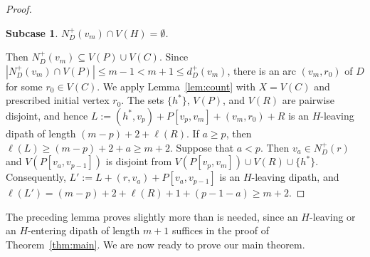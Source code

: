 \documentclass[12pt]{article}
\numberwithin{equation}{section}
\theoremstyle{plain}
\newtheorem{subcase}{Subcase}[case]
\theoremstyle{definition}
\begin{document}
\begin{proof}
\begin{subcase}
$N_D^+(v_m)\cap V(H)=\emptyset$.
\end{subcase}
Then $N_D^+(v_m)\subseteq V(P)\cup V(C)$.
Since $|N_D^+(v_m)\cap V(P)|\le m-1<m+1\le d_D^+(v_m)$, there is an arc $(v_m,r_0)$ of $D$ for some $r_0\in V(C)$.
We apply Lemma~\ref{lem:count} with $X=V(C)$ and prescribed initial vertex $r_0$.
The sets $\{h^*\}$, $V(P)$, and $V(R)$ are pairwise disjoint, and hence $L:=(h^*,v_p)+P[v_p,v_m]+(v_m,r_0)+R$ is an $H$-leaving dipath of length $(m-p)+2+\ell(R)$.
If $a\ge p$, then $\ell(L)\ge(m-p)+2+a\ge m+2$.
Suppose that $a<p$.
Then $v_a\in N_D^+(r)$ and $V(P[v_a,v_{p-1}])$ is disjoint from $V(P[v_p,v_m])\cup V(R)\cup\{h^*\}$.
Consequently, $L':=L+(r,v_a)+P[v_a,v_{p-1}]$ is an $H$-leaving dipath, and $\ell(L')=(m-p)+2+\ell(R)+1+(p-1-a)\ge m+2$.
\end{proof}

The preceding lemma proves slightly more than is needed, since an $H$-leaving or an $H$-entering dipath of length $m+1$ suffices in the proof of Theorem~\ref{thm:main}. We are now ready to prove our main theorem.
\end{document}
